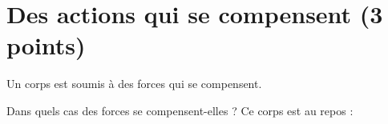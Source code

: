 \section{Des actions qui se compensent (3 points)}\label{actions}

Un corps est soumis à des forces qui se compensent.

\begin{questions}
	\question Dans quels cas des forces se compensent-elles ?
	\question Ce corps est au repos :
	
	
\end{questions}